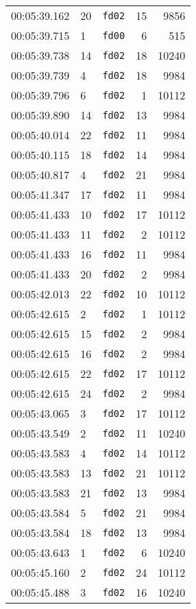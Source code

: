 \documentclass{article}
\begin{document}
\begin{longtable}{lllrr}
00:05:39.162 & 20 & \texttt{fd02} & 15 & 9856 \\
00:05:39.715 & 1 & \texttt{fd00} & 6 & 515 \\
00:05:39.738 & 14 & \texttt{fd02} & 18 & 10240 \\
00:05:39.739 & 4 & \texttt{fd02} & 18 & 9984 \\
00:05:39.796 & 6 & \texttt{fd02} & 1 & 10112 \\
00:05:39.890 & 14 & \texttt{fd02} & 13 & 9984 \\
00:05:40.014 & 22 & \texttt{fd02} & 11 & 9984 \\
00:05:40.115 & 18 & \texttt{fd02} & 14 & 9984 \\
00:05:40.817 & 4 & \texttt{fd02} & 21 & 9984 \\
00:05:41.347 & 17 & \texttt{fd02} & 11 & 9984 \\
00:05:41.433 & 10 & \texttt{fd02} & 17 & 10112 \\
00:05:41.433 & 11 & \texttt{fd02} & 2 & 10112 \\
00:05:41.433 & 16 & \texttt{fd02} & 11 & 9984 \\
00:05:41.433 & 20 & \texttt{fd02} & 2 & 9984 \\
00:05:42.013 & 22 & \texttt{fd02} & 10 & 10112 \\
00:05:42.615 & 2 & \texttt{fd02} & 1 & 10112 \\
00:05:42.615 & 15 & \texttt{fd02} & 2 & 9984 \\
00:05:42.615 & 16 & \texttt{fd02} & 2 & 9984 \\
00:05:42.615 & 22 & \texttt{fd02} & 17 & 10112 \\
00:05:42.615 & 24 & \texttt{fd02} & 2 & 9984 \\
00:05:43.065 & 3 & \texttt{fd02} & 17 & 10112 \\
00:05:43.549 & 2 & \texttt{fd02} & 11 & 10240 \\
00:05:43.583 & 4 & \texttt{fd02} & 14 & 10112 \\
00:05:43.583 & 13 & \texttt{fd02} & 21 & 10112 \\
00:05:43.583 & 21 & \texttt{fd02} & 13 & 9984 \\
00:05:43.584 & 5 & \texttt{fd02} & 21 & 9984 \\
00:05:43.584 & 18 & \texttt{fd02} & 13 & 9984 \\
00:05:43.643 & 1 & \texttt{fd02} & 6 & 10240 \\
00:05:45.160 & 2 & \texttt{fd02} & 24 & 10112 \\
00:05:45.488 & 3 & \texttt{fd02} & 16 & 10240 \\

\end{longtable}
\end{document}
